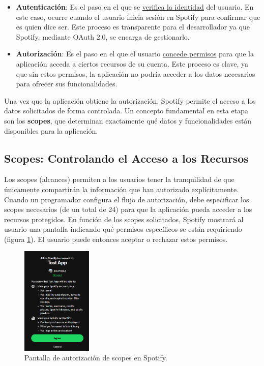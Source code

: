 \begin{itemize}
    \item \textbf{Autenticación}: Es el paso en el que se \underline{verifica la identidad} del usuario. En este caso, ocurre cuando el usuario inicia sesión en Spotify para confirmar que es quien dice ser. Este proceso es transparente para el desarrollador ya que Spotify, mediante OAuth 2.0, se encarga de gestionarlo.
    \item \textbf{Autorización}: Es el paso en el que el usuario \underline{concede permisos} para que la aplicación acceda a ciertos recursos de su cuenta. Este proceso es clave, ya que sin estos permisos, la aplicación no podría acceder a los datos necesarios para ofrecer sus funcionalidades.
\end{itemize}

Una vez que la aplicación obtiene la autorización, Spotify permite el acceso a los datos solicitados de forma controlada. Un concepto fundamental en esta etapa son los \textbf{scopes}, que determinan exactamente qué datos y funcionalidades están disponibles para la aplicación.

\subsection*{Scopes: Controlando el Acceso a los Recursos} \label{subsubsec:scopes}

Los scopes (alcances) permiten a los usuarios tener la tranquilidad de que únicamente compartirán la información que han autorizado explícitamente. Cuando un programador configura el flujo de autorización, debe especificar los scopes necesarios (de un total de 24) para que la aplicación pueda acceder a los recursos protegidos. En función de los scopes solicitados, Spotify mostrará al usuario una pantalla indicando qué permisos específicos se están requiriendo (figura \ref{fig:auth_popup}). El usuario puede entonces aceptar o rechazar estos permisos.

\begin{figure}[H]
    \centering
    \includegraphics[width=0.3\textwidth]{./figures/auth_popup.png}
    \caption{Pantalla de autorización de scopes en Spotify.}
    \label{fig:auth_popup}
\end{figure}

